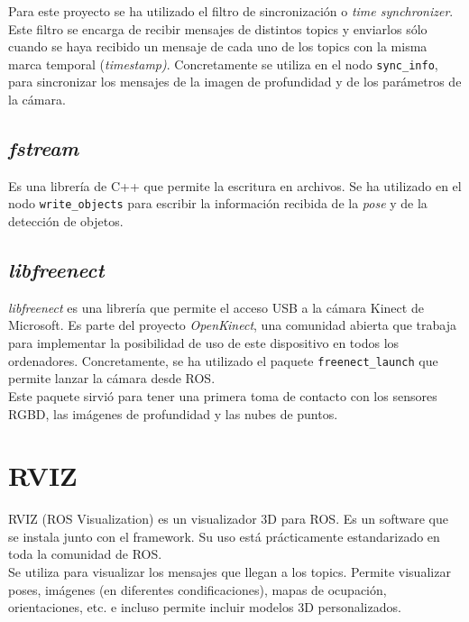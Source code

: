 Para este proyecto se ha utilizado el filtro de sincronización o \textit{time synchronizer}. Este filtro se encarga de recibir mensajes de distintos topics y enviarlos sólo cuando se haya recibido un mensaje de cada uno de los topics con la misma marca temporal (\textit{timestamp)}. Concretamente se utiliza en el nodo \texttt{sync\_info}, para sincronizar los mensajes de la imagen de profundidad y de los parámetros de la cámara. \\ 

\subsection{\textit{fstream}}

Es una librería de C++ que permite la escritura en archivos. Se ha utilizado en el nodo \texttt{write\_objects} para escribir la información recibida de la \textit{pose} y de la detección de objetos. \cite{fstream}\\

\subsection{\textit{libfreenect}}

\textit{libfreenect} es una librería que permite el acceso USB a la cámara Kinect de Microsoft. Es parte del proyecto \textit{OpenKinect}, una comunidad abierta que trabaja para implementar la posibilidad de uso de este dispositivo en todos los ordenadores. Concretamente, se ha utilizado el paquete \texttt{freenect\_launch} que permite lanzar la cámara desde ROS. \cite{libfreenect}\\

Este paquete sirvió para tener una primera toma de contacto con los sensores RGBD, las imágenes de profundidad y las nubes de puntos.\\

\section{RVIZ}

RVIZ (ROS Visualization) es un visualizador 3D para ROS. Es un software que se instala junto con el framework. Su uso está prácticamente estandarizado en toda la comunidad de ROS.\\

Se utiliza para visualizar los mensajes que llegan a los topics. Permite visualizar poses, imágenes (en diferentes condificaciones),  mapas de ocupación, orientaciones, etc. e incluso permite incluir modelos 3D personalizados.\\

